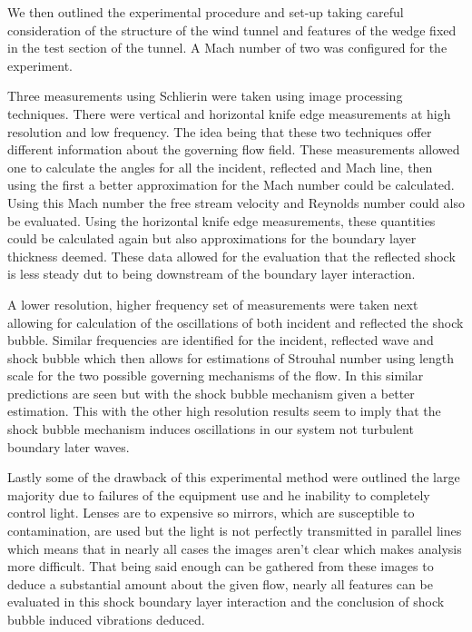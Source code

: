 \documentclass[a4paper,10pt,twoside]{article}
\begin{document}
\begin{multicols}{2}
We then outlined the experimental procedure and set-up taking careful consideration of the structure of the wind tunnel and features of the wedge fixed in the test section of the tunnel. A Mach number of two was configured for the experiment. \par



Three measurements using Schlierin were taken using image processing techniques. There were vertical and horizontal knife edge measurements at high resolution and low frequency. The idea being that these two techniques offer different information about the governing flow field. These measurements allowed one to calculate the angles for all the incident, reflected and Mach line, then using the first a better approximation for the Mach number could be calculated. Using this Mach number the free stream velocity and Reynolds number could also be evaluated. Using the horizontal knife edge measurements, these quantities could be calculated again but also approximations for the boundary layer thickness deemed. These data allowed for the evaluation that the reflected shock is less steady dut to being downstream of the boundary layer interaction. \par 



A lower resolution, higher frequency set of measurements were taken next allowing for calculation of the oscillations of both incident and reflected the shock bubble. Similar frequencies are identified for the incident, reflected wave and shock bubble which then allows for estimations of Strouhal number using length scale for the two possible governing mechanisms of the flow. In this similar predictions are seen but with the shock bubble mechanism given a better estimation. This with the other high resolution results seem to imply that the shock bubble mechanism induces oscillations in our system not turbulent boundary later waves. \par


Lastly some of the drawback of this experimental method were outlined the large majority due to failures of the equipment use and he inability to completely control light. Lenses are to expensive so mirrors, which are susceptible to contamination, are used but the light is not perfectly transmitted in parallel lines which means that in nearly all cases the images aren't clear which makes analysis more difficult. That being said enough can be gathered from these images to deduce a substantial amount about the given flow, nearly all features can be evaluated in this shock boundary layer interaction and the conclusion of shock bubble induced vibrations deduced. 






\end{multicols}
\end{document}
